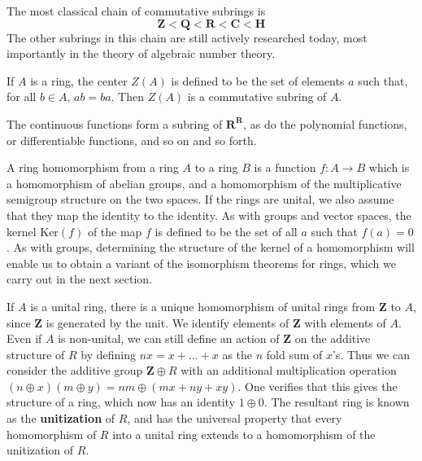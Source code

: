 \begin{example}
    The most classical chain of commutative subrings is
    \[ \mathbf{Z} < \mathbf{Q} < \mathbf{R} < \mathbf{C} < \mathbf{H} \]
    The other subrings in this chain are still actively researched today, most importantly in the theory of algebraic number theory.
\end{example}

\begin{example}
    If $A$ is a ring, the center $Z(A)$ is defined to be the set of elements $a$ such that, for all $b \in A$, $ab = ba$. Then $Z(A)$ is a commutative subring of $A$.
\end{example}

\begin{example}
    The continuous functions form a subring of $\mathbf{R}^\mathbf{R}$, as do the polynomial functions, or differentiable functions, and so on and so forth.
\end{example}

A ring homomorphism from a ring $A$ to a ring $B$ is a function $f:A \to B$ which is a homomorphism of abelian groups, and a homomorphism of the multiplicative semigroup structure on the two spaces. If the rings are unital, we also assume that they map the identity to the identity. As with groups and vector spaces, the kernel $\text{Ker}(f)$ of the map $f$ is defined to be the set of all $a$ such that $f(a) = 0$. As with groups, determining the structure of the kernel of a homomorphism will enable us to obtain a variant of the isomorphism theorems for rings, which we carry out in the next section.

\begin{example}
    If $A$ is a unital ring, there is a unique homomorphism of unital rings from $\mathbf{Z}$ to $A$, since $\mathbf{Z}$ is generated by the unit. We identify elements of $\mathbf{Z}$ with elements of $A$. Even if $A$ is non-unital, we can still define an action of $\mathbf{Z}$ on the additive structure of $R$ by defining $nx = x + \dots + x$ as the $n$ fold sum of $x$'s. Thus we can consider the additive group $\mathbf{Z} \oplus R$ with an additional multiplication operation $(n \oplus x)(m \oplus y) = nm \oplus (mx + ny + xy)$. One verifies that this gives the structure of a ring, which now has an identity $1 \oplus 0$. The resultant ring is known as the {\bf unitization} of $R$, and has the universal property that every homomorphism of $R$ into a unital ring extends to a homomorphism of the unitization of $R$.
\end{example}

